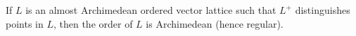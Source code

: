 If $L$ is an almost Archimedean ordered vector lattice such that $L^+$ distinguishes points in $L$, then the order of $L$ is Archimedean (hence regular).
